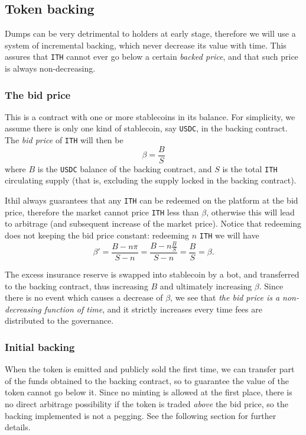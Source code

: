 \documentclass[a4paper,10 pt]{article}
\theoremstyle{definition}
\begin{document}
\subsection{Token backing}\label{backing}

Dumps can be very detrimental to holders at early stage, therefore we will use a system of incremental backing, which never decrease its value with time. This assures that \verb|ITH| cannot ever go below a certain {\it backed price}, and that such price is always non-decreasing.

\subsubsection{The bid price}

This is a contract with one or more stablecoins in its balance. For simplicity, we assume there is only one kind of stablecoin, say \verb|USDC|, in the backing contract. The {\it bid price} of \verb|ITH| will then be
\begin{equation}\label{bid price}
\beta = \frac{B}{S}
\end{equation} 
where $B$ is the \verb|USDC| balance of the backing contract, and $S$ is the total \verb|ITH| circulating supply (that is, excluding the supply locked in the backing contract).

Ithil always guarantees that any \verb|ITH| can be redeemed on the platform at the bid price, therefore the market cannot price \verb|ITH| less than $\beta$, otherwise this will lead to arbitrage (and subsequent increase of the market price). Notice that redeeming does not  keeping the bid price constant: redeeming $n$ \verb|ITH| we will have
$$\beta' = \frac{B - n\pi}{S - n} = \frac{B - n\frac{B}{S}}{S-n} = \frac{B}{S} = \beta.$$

The excess insurance reserve is swapped into stablecoin by a bot, and transferred to the backing contract, thus increasing $B$ and ultimately increasing $\beta$. Since there is no event which causes a decrease of $\beta$, we see that {\it the bid price is a non-decreasing function of time}, and it strictly increases every time fees are distributed to the governance.

\subsubsection{Initial backing}

When the token is emitted and publicly sold the first time, we can transfer part of the funds obtained to the backing contract, so to guarantee the value of the token cannot go below it. Since no minting is allowed at the first place, there is no direct arbitrage possibility if the token is traded {\it above} the bid price, so the backing implemented is not a pegging. See the following section for further details.
\end{document}
